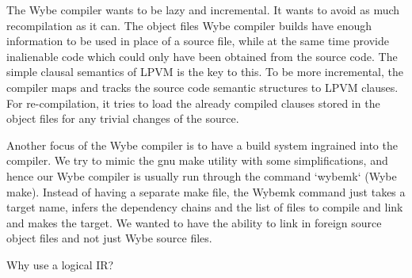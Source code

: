The Wybe compiler wants to be lazy and incremental. It wants to avoid as much
recompilation as it can. The object files Wybe compiler builds have enough
information to be used in place of a source file, while at the same time
provide inalienable code which could only have been obtained from the source
code. The simple clausal semantics of LPVM is the key to this. To be more
incremental, the compiler maps and tracks the source code semantic structures
to LPVM clauses. For re-compilation, it tries to load the already compiled
clauses stored in the object files for any trivial changes of the source. 

Another focus of the Wybe compiler is to have a build system ingrained into the
compiler. We try to mimic the gnu make utility with some simplifications, and
hence our Wybe compiler is usually run through the command `wybemk` (Wybe
make). Instead of having a separate make file, the Wybemk command just takes a
target name, infers the dependency chains and the list of files to compile and
link and makes the target. We wanted to have the ability to link in foreign
source object files and not just Wybe source files. 



Why use a logical IR?
